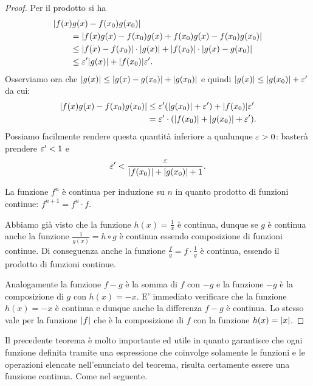 \begin{proof}
Per il prodotto si ha
\begin{align*}
  \MoveEqLeft \abs{f(x)g(x)-f(x_0)g(x_0)}\\
  &= \abs{f(x)g(x) - f(x_0)g(x) + f(x_0)g(x) - f(x_0)g(x_0)}\\
  &\le \abs{f(x)-f(x_0)}\cdot\abs{g(x)} + \abs{f(x_0)}\cdot \abs{g(x)-g(x_0)} \\
  &\le \eps' \abs{g(x)} + \abs{f(x_0)} \eps'.
\end{align*}
Osserviamo ora che ${\left|g(x)\right|}\le {\left|g(x)-g(x_0)\right|} + {\left|g(x_0)\right|}$
e quindi ${\left|g(x)\right|}\le {\left|g(x_0)\right|}+\varepsilon'$ da cui:
\begin{align*}
  {\left|f(x)g(x)-f(x_0)g(x_0)\right|}
  &\le \varepsilon' {\left( {\left|g(x_0)\right|}+\varepsilon' \right)} + {\left|f(x_0)\right|} \varepsilon' \\
  &= \varepsilon' \cdot({\left|f(x_0)\right|} + {\left|g(x_0)\right|} + \varepsilon').
\end{align*}
Possiamo facilmente rendere questa quantità inferiore a
qualunque $\varepsilon>0$: basterà prendere $\varepsilon'<1$ e
\[
  \varepsilon' < \frac{\varepsilon}{{\left|f(x_0)\right|} + {\left|g(x_0)\right|} + 1}.
\]

La funzione $f^n$ è continua per induzione su $n$
in quanto prodotto di funzioni
continue: $f^{n+1} = f^{n} \cdot f$.

Abbiamo già visto che la funzione $h(x) = \frac{1}{x}$ è continua,
dunque se $g$ è continua anche la funzione $\frac{1}{g(x)} = h\circ g$
è continua essendo composizione di funzioni continue. 
Di conseguenza anche la funzione $\frac{f}{g} = f \cdot \frac{1}{g}$
è continua, essendo il prodotto di funzioni continue.

Analogamente la funzione $f-g$ è la somma di $f$ con $-g$ e
la funzione $-g$ è la composizione di $g$ con $h(x)=-x$.
E' immediato verificare che la funzione $h(x)=-x$ è continua
e dunque anche la differenza $f-g$ è continua.
Lo stesso vale per la funzione ${\left|f\right|}$ che è la composizione
di $f$ con la funzione $h(x) = {\left|x\right|}$.
\end{proof}

Il precedente teorema è molto importante ed utile in quanto
garantisce che ogni funzione definita tramite una espressione
che coinvolge solamente le funzioni e le operazioni
elencate nell'enunciato del teorema, risulta certamente
essere una funzione continua. Come nel seguente.

